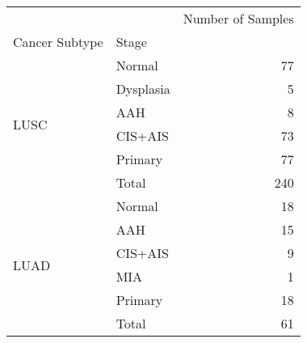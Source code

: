\begin{tabular}{l|lr}
\toprule
     &       & Number of Samples \\
Cancer Subtype & Stage &                   \\
\midrule
\multirow{6}{*}{LUSC} & Normal &                77 \\
     & Dysplasia &                 5 \\
     & AAH &                 8 \\
     & CIS+AIS &                73 \\
     & Primary &                77 \\
     & Total &               240 \\
\cline{1-3}
\multirow{6}{*}{LUAD} & Normal &                18 \\
     & AAH &                15 \\
     & CIS+AIS &                 9 \\
     & MIA &                 1 \\
     & Primary &                18 \\
     & Total &                61 \\
\bottomrule
\end{tabular}
